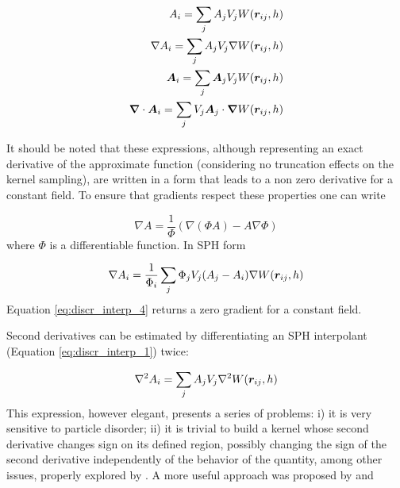 % 
\begin{equation} \label{eq:discr_interp_2}
\begin{split}
A_i = \sum_j{A_j V_j W(\boldsymbol{r}_{ij}, h)} \\
\nabla {A}_i = \sum_j{A_j V_j \nabla W(\boldsymbol{r}_{ij}, h)} \\
\boldsymbol{A}_i = \sum_j{\boldsymbol{A}_j V_j W(\boldsymbol{r}_{ij}, h)} \\
\boldsymbol{\nabla} \cdot \boldsymbol{A}_i = \sum_j{ V_j \boldsymbol{A}_j \cdot \boldsymbol{\nabla} W(\boldsymbol{r}_{ij}, h)} 
\end{split}
\end{equation}
%

It should be noted that these expressions, although representing an exact derivative of the approximate function (considering no truncation effects on the kernel sampling), are written in a form that leads to a non zero derivative for a constant field. To ensure that gradients respect these properties one can write

% 
\begin{equation} \label{eq:discr_interp_3}
\nabla {A} = \frac{1}{\Phi}\left( \nabla(\Phi A)- A\nabla\Phi \right)
\end{equation}
%
where $\Phi$ is a differentiable function. In \ac{SPH} form

% 
\begin{equation} \label{eq:discr_interp_4}
\nabla {A}_i = \frac{1}{\Phi_i} \sum_j{\Phi_j V_j(A_j-A_i) \nabla W(\boldsymbol{r}_{ij}, h)}
\end{equation}
%
Equation \eqref{eq:discr_interp_4} returns a zero gradient for a constant field.  

Second derivatives can be estimated by differentiating an \ac{SPH} interpolant (Equation \eqref{eq:discr_interp_1}) twice:

% 
\begin{equation} \label{eq:2nd_der_sph_I}
\nabla^2 {A}_i  = \sum_j{A_j V_j \nabla^2 W(\boldsymbol{r}_{ij}, h)} 
\end{equation}
%
This expression, however elegant, presents a series of problems: i) it is very sensitive to particle disorder; ii) it is trivial to build a kernel whose second derivative changes sign on its defined region, possibly changing the sign of the second derivative independently of the behavior of the quantity, among other issues, properly explored by \cite{Brookshaw-1985, Monaghan-2005}. A more useful approach was proposed by \cite{Cleary-1996} and \cite{Morris-1997}

